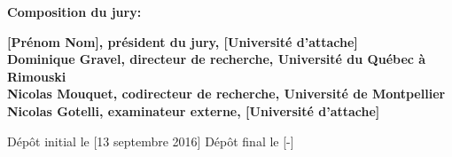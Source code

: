 \thispagestyle{empty}

\null
\vfill
\noindent \textbf{Composition du jury:}\\
\vspace{1cm}

\begin{singlespace}
  \noindent \textbf{[Prénom Nom], président du jury, [Université d’attache]}\\

  \noindent \textbf{Dominique Gravel, directeur de recherche, Université du Québec à Rimouski}\\

  \noindent \textbf{Nicolas Mouquet, codirecteur de recherche, Université de Montpellier}\\

  \noindent \textbf{Nicolas Gotelli, examinateur externe, [Université d’attache]}\\
\end{singlespace}

\vspace{2cm}
\noindent Dépôt initial le [13 septembre 2016]
\hspace{3cm}
Dépôt final le [-]


\cleardoublepage
